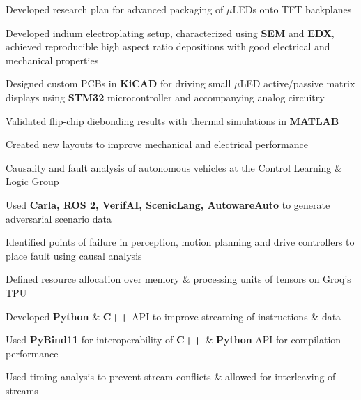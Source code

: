 \documentclass[]{chandan-cv}
\begin{document}
\begin{minipage}[t]{0.78\textwidth}
\begin{tightemize}
        \item Developed research plan for advanced packaging of $\mu$LEDs onto TFT backplanes
		\item Developed indium electroplating setup, characterized using \textbf{SEM} and \textbf{EDX}, achieved reproducible high aspect ratio depositions with good electrical and mechanical properties 
		\item Designed custom PCBs in \textbf{KiCAD} for driving small $\mu$LED active/passive matrix displays using \textbf{STM32} microcontroller and accompanying analog circuitry
		\item Validated flip-chip diebonding results with thermal simulations in \textbf{MATLAB}
		\item Created new layouts to improve mechanical and electrical performance 
\end{tightemize}
\sectionsep

\begin{tightemize}
        \item Causality and fault analysis of autonomous vehicles at the Control Learning \& Logic Group
		\item Used \textbf{Carla, ROS 2, VerifAI, ScenicLang, AutowareAuto} to generate adversarial scenario data  
		\item Identified points of failure in perception, motion planning and drive controllers to place fault using causal analysis
\end{tightemize}
\sectionsep

\begin{tightemize}
        \item Defined resource allocation over memory \& processing units of tensors on Groq's TPU
        \item Developed \textbf{Python} \& \textbf{C++} API to improve streaming of instructions \& data
        \item Used \textbf{PyBind11} for interoperability of \textbf{C++} \& \textbf{Python} API for compilation performance 
        \item Used timing analysis to prevent stream conflicts \& allowed for interleaving of streams
\end{tightemize}
\sectionsep


\end{minipage}
\end{document}
